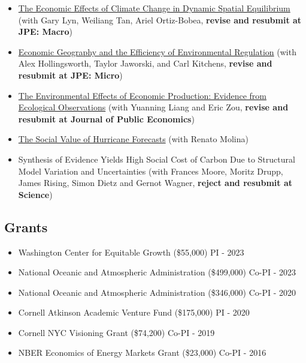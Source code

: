 \documentclass[12pt]{res} %
\begin{document}
\begin{resume}
\begin{itemize} %
	\item[] \href{https://osf.io/preprints/socarxiv/usghb}{The Economic Effects of Climate Change in Dynamic Spatial Equilibrium} (with Gary Lyn, Weiliang Tan, Ariel Ortiz-Bobea, \textbf{revise and resubmit at JPE: Macro})
	\item[]\href{https://osf.io/preprints/socarxiv/x6fuw/}{Economic Geography and the Efficiency of Environmental Regulation} (with Alex Hollingsworth, Taylor Jaworski, and Carl Kitchens, \textbf{revise and resubmit at JPE: Micro})
	\item[] \href{https://osf.io/preprints/socarxiv/qy76a}{The Environmental Effects of Economic Production: Evidence from Ecological Observations} (with Yuanning Liang and Eric Zou, \textbf{revise and resubmit at Journal of Public Economics})
	\item[] \href{https://ivanrudik.com}{The Social Value of Hurricane Forecasts} (with Renato Molina)
	\item[] Synthesis of Evidence Yields High Social Cost of Carbon Due to Structural Model Variation and Uncertainties (with Frances Moore, Moritz Drupp, James Rising, Simon Dietz and Gernot Wagner, \textbf{reject and resubmit at Science})
\end{itemize}
 
\vspace{-.2in}

\subsection{Grants}
\begin{itemize}  \itemsep -1pt
	\item[] Washington Center for Equitable Growth (\$55,000) \hfill PI - 2023
	\item[] National Oceanic and Atmospheric Administration (\$499,000) \hfill Co-PI - 2023
	\item[] National Oceanic and Atmospheric Administration (\$346,000) \hfill Co-PI - 2020
	\item[] Cornell Atkinson Academic Venture Fund (\$175,000) \hfill PI - 2020
	\item[] Cornell NYC Visioning Grant (\$74,200) \hfill Co-PI - 2019
	\item[] NBER Economics of Energy Markets Grant (\$23,000) \hfill Co-PI - 2016
\end{itemize}

\vspace{-.2in}


\end{resume}
\end{document}
